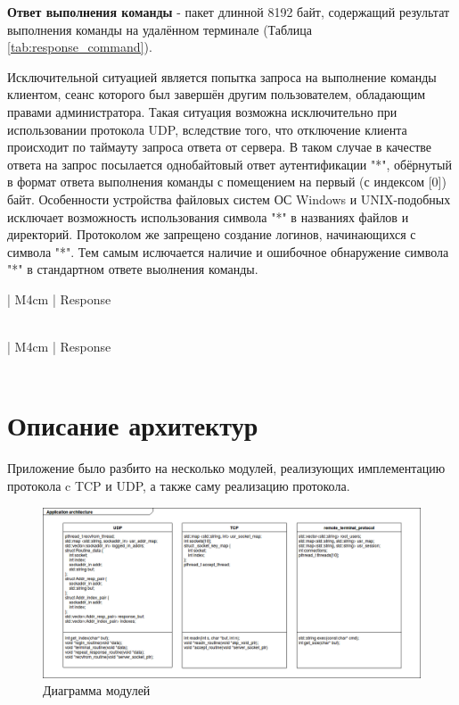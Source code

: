 \textbf{Ответ выполнения команды} - пакет длинной 8192 байт, содержащий результат выполнения команды на удалённом терминале (Таблица \ref{tab:response_command}).

Исключительной ситуацией является попытка запроса на выполнение команды клиентом, сеанс которого был завершён другим пользователем, обладающим правами администратора. Такая ситуация возможна исключительно при использовании протокола UDP, вследствие того, что отключение клиента происходит по таймауту запроса ответа от сервера. В таком случае в качестве ответа на запрос посылается однобайтовый ответ аутентификации "*", обёрнутый в формат ответа выполнения команды с помещением на первый (с индексом [0]) байт. Особенности устройства файловых систем ОС Windows и UNIX-подобных исключает возможность использования символа "*" в названиях файлов и директорий. Протоколом же запрещено создание логинов, начинающихся с символа "*". Тем самым ислючается наличие и ошибочное обнаружение символа "*" в стандартном ответе выолнения команды.

\begin{table}[h]
	\centering
	\begin{tabular}[center]{| M{4cm} |}
	\hline
	Response \\ \hline
	[ 0 - 1 ]\\
	\hline
	\end{tabular}
	\caption{Формат ответа аутентификации}
	\label{tab:response_login}
\end{table}

\begin{table}[h]
	\centering
	\begin{tabular}[center]{| M{4cm} |}
	\hline
	Response \\ \hline
	[ 0 - 8191 ]\\
	\hline
	\end{tabular}
	\caption{Формат ответа выполнения команды}
	\label{tab:response_command}
\end{table}

\section{Описание архитектур}

Приложение было разбито на несколько модулей, реализующих имплементацию протокола c TCP и UDP, а также саму реализацию протокола.

\begin{figure}[H]
\centering
\includegraphics[width=1\textwidth]{pics/arch.png}
\caption{Диаграмма модулей}
\label{diag_mod}
\end{figure}

